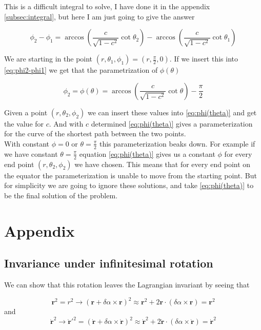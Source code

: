 \documentclass[a4paper,norsk, 10pt]{article}
\begin{document}
This is a difficult integral to solve, I have done it in the appendix \ref{subsec:integral}, but here I am just going to give the answer

\begin{equation}
\phi_2 - \phi_1 = \arccos\left(\frac{c}{\sqrt{1-c^2}}\cot\theta_2\right) - \arccos\left(\frac{c}{\sqrt{1-c^2}}\cot\theta_1\right)
\label{eq:phi2-phi1}
\end{equation}

We are starting in the point $(r,\theta_1, \phi_1) = (r,\frac{\pi}{2},0)$. If we insert this into \eqref{eq:phi2-phi1} we get that the parametrization of $\phi(\theta)$

\begin{equation}
\phi_2 = \phi(\theta) = \arccos\left(\frac{c}{\sqrt{1-c^2}}\cot\theta\right) - \frac{\pi}{2}
\label{eq:phi(theta)}
\end{equation}


Given a point $(r,\theta_2,\phi_2)$ we can insert these values into \eqref{eq:phi(theta)} and get the value for $c$. And with $c$ determined \eqref{eq:phi(theta)} gives a parameterization for the curve of the shortest path between the two points.\\

With constant $\phi = 0$ or $\theta = \frac{\pi}{2}$ this parameterization beaks down. For example if we have constant $\theta = \frac{\pi}{2}$ equation \eqref{eq:phi(theta)} gives us a constant $\phi$ for every end point $(r,\theta_2,\phi_2)$ we have chosen. This means that for every end point on the equator the parameterization is unable to move from the starting point. But for simplicity we are going to ignore these solutions, and take \eqref{eq:phi(theta)} to be the final solution of the problem.










\section{Appendix}

\subsection{Invariance under infinitesimal rotation}
We can show that this rotation leaves the Lagrangian invariant by seeing that

$$
\mathbf{r}^2 = r^2 \rightarrow (\mathbf{r} + \delta\alpha\times\mathbf{r})^2 \approx \mathbf{r}^2 + 2\mathbf{r}\cdot(\delta\alpha\times \mathbf{r}) = \mathbf{r}^2
$$
and
$$
\mathbf{\dot{r}}^2 \rightarrow \mathbf{\dot{r}}'^2 = (\mathbf{\dot{r}} + \delta \alpha\times \mathbf{\dot{r}})^2 \approx \mathbf{\dot{r}}^2 + 2\mathbf{\dot{r}}\cdot(\delta\alpha\times \mathbf{\dot{r}}) = \mathbf{\dot{r}}^2
$$
\end{document}
